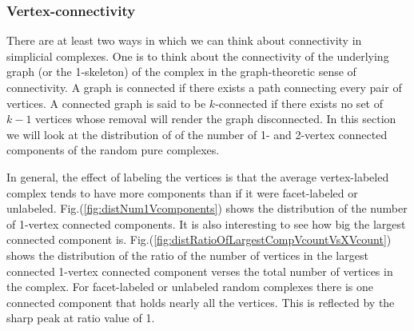 \documentclass[12pt]{article}
\theoremstyle{plain}
\theoremstyle{definition}
\theoremstyle{remark}
\begin{document}


\subsubsection{Vertex-connectivity}
There are at least two ways in which we can think about connectivity in simplicial complexes. One is to think about the connectivity of the underlying graph (or the 1-skeleton) of the complex in the graph-theoretic sense of connectivity. A graph is connected if there exists a path connecting every pair of vertices. A connected graph is said to be $k$-connected if there exists no set of $k-1$ vertices whose removal will render the graph disconnected. In this section we will look at the distribution of of the number of 1- and 2-vertex connected components of the random pure complexes. 

In general, the effect of labeling the vertices is that the average vertex-labeled complex tends to have more components than if it were facet-labeled or unlabeled. Fig.(\ref{fig:distNum1Vcomponents}) shows the distribution of the number of 1-vertex connected components. It is also interesting to see how big the largest connected component is. Fig.(\ref{fig:distRatioOfLargestCompVcountVsXVcount}) shows the distribution of the ratio of the number of vertices in the largest connected 1-vertex connected component verses the total number of vertices in the complex. For facet-labeled or unlabeled random complexes there is one connected component that holds nearly all the vertices. This is reflected by the sharp peak at ratio value of 1.
\end{document}
